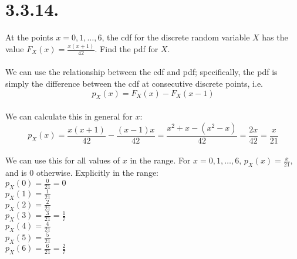\documentclass{article}
\begin{document}
{\section*{3.3.14.} 
At the points \(x = 0, 1, \ldots, 6\), the cdf for the discrete random variable \(X\) has the value \(F_X(x) = \frac{x(x + 1)}{42}\). Find the pdf for \(X\).
\\
\\
We can use the relationship between the cdf and pdf; specifically, the pdf is simply the difference between the cdf at consecutive discrete points, i.e. \[p_X(x) = F_X(x) - F_X(x-1)\]
\\
We can calculate this in general for \(x\):
\[p_X(x) = \frac{x(x + 1)}{42} - \frac{(x - 1)x}{42} = \frac{x^2 + x - (x^2 - x)}{42} = \frac{2x}{42} = \frac{x}{21}\]
\\
We can use this for all values of \(x\) in the range. For \(x = 0, 1, \ldots, 6\), \(p_X(x) = \frac{x}{21}\), and is 0 otherwise. Explicitly in the range:
\\
\(p_X(0) = \frac{0}{21} = 0\)
\\
\(p_X(1) = \frac{1}{21}\)
\\
\(p_X(2) = \frac{2}{21}\)
\\
\(p_X(3) = \frac{3}{21} = \frac{1}{7}\)
\\
\(p_X(4) = \frac{4}{21}\)
\\
\(p_X(5) = \frac{5}{21}\)
\\
\(p_X(6) = \frac{6}{21} = \frac{2}{7}\)

}
\end{document}
